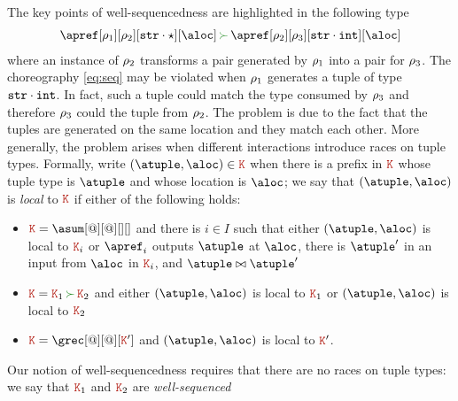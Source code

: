 %
% 
%

\bigskip

The key points of well-sequencedness are highlighted in 
the following type
\begin{align}\label{eq:seq}
  \apref[\arole_1][\arole_2][{\asort[str] \cdot \wildcard}][\aloc] \seqop
  \apref[\arole_2][\arole_3][{\asort[str] \cdot \asort[int]}][\aloc]
\end{align}
%
where an instance of $\arole_2$ transforms a pair generated by
$\arole_1$ into a pair for $\arole_3$.
%
The choreography \eqref{eq:seq} may be violated when
$\arole_1$ generates a tuple of type $\asort[str] \cdot \asort[int]$.
%
In fact, such a tuple could match the type consumed by $\arole_3$ and
therefore $\arole_3$ could  the tuple from $\arole_2$.
%
The problem is due to the fact that the tuples are generated on the same location and they match each other.
%
More generally, the problem arises when different interactions introduce races on tuple types. Formally, write $(\atuple, \aloc) \in \aK$ when there is a
prefix in $\aK$ whose tuple type is $\atuple$ and whose location is
$\aloc$; we say that $(\atuple, \aloc)$ is \emph{local} to $\aK$ if
either of the following holds:
\begin{itemize}
\item $\aK = \asum[@][@][][]$ and there is $i \in I$ such that either
  $(\atuple, \aloc)$ is local to $\aK_i$ or $\apref_i$ outputs
  $\atuple$ at $\aloc$, there is $\atuple'$ in an input from $\aloc$
  in $\aK_i$,
 and $\atuple \matches \atuple'$
\item $\aK = \aK_1 \seqop \aK_2$ and either $(\atuple, \aloc)$ is local to
  $\aK_1$ or   $(\atuple, \aloc)$ is local to $\aK_2$
\item $\aK = \grec[@][@][\aK']$ and $(\atuple, \aloc)$ is local to
  $\aK'$.
\end{itemize}
%
Our notion of well-sequencedness requires that there are no races on
tuple types: we say that $\aK_1$ and $\aK_2$ are \emph{well-sequenced}
